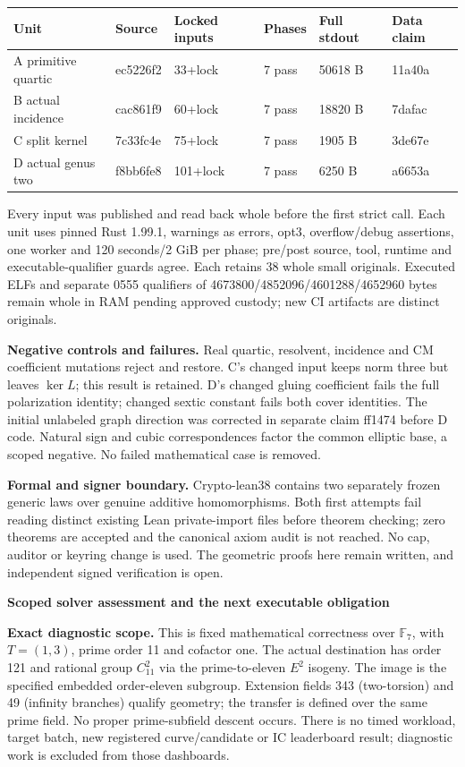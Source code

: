 \documentclass[10pt,a4paper]{article}
\begin{document}
\begin{center}\small
\begin{tabular}{llllll}
\toprule
Unit & Source & Locked inputs & Phases & Full stdout & Data claim\\
\midrule
A primitive quartic & ec5226f2 & 33+lock & 7 pass & 50618 B & 11a40a\\
B actual incidence & cac861f9 & 60+lock & 7 pass & 18820 B & 7dafac\\
C split kernel & 7c33fc4e & 75+lock & 7 pass & 1905 B & 3de67e\\
D actual genus two & f8bb6fe8 & 101+lock & 7 pass & 6250 B & a6653a\\
\bottomrule
\end{tabular}\end{center}
Every input was published and read back whole before the first strict
call. Each unit uses pinned Rust 1.99.1, warnings as errors, opt3,
overflow/debug assertions, one worker and 120 seconds/2 GiB per phase;
pre/post source, tool, runtime and executable-qualifier guards agree.
Each retains 38 whole small originals. Executed ELFs and separate 0555
qualifiers of 4673800/4852096/4601288/4652960 bytes remain whole in RAM
pending approved custody; new CI artifacts are distinct originals.

\textbf{Negative controls and failures.} Real quartic, resolvent,
incidence and CM coefficient mutations reject and restore. C's changed
input keeps norm three but leaves $\ker L$; this result is retained.
D's changed gluing coefficient fails the full polarization identity;
changed sextic constant fails both cover identities. The initial
unlabeled graph direction was corrected in separate claim ff1474 before
D code. Natural sign and cubic correspondences factor the common
elliptic base, a scoped negative. No failed mathematical case is removed.

\textbf{Formal and signer boundary.} Crypto-lean38 contains two separately
frozen generic laws over genuine additive homomorphisms. Both first
attempts fail reading distinct existing Lean private-import files before
theorem checking; zero theorems are accepted and the canonical axiom audit
is not reached. No cap, auditor or keyring change is used. The geometric
proofs here remain written, and independent signed verification is open.

\newpage
{\Large\bfseries Scoped solver assessment and the next executable obligation}\par

\textbf{Exact diagnostic scope.} This is fixed mathematical correctness
over $\mathbb F_7$, with $T=(1,3)$, prime order 11 and cofactor one.
The actual destination has order 121 and rational group $C_{11}^2$ via
the prime-to-eleven $E^2$ isogeny. The image is the specified embedded
order-eleven subgroup. Extension fields 343 (two-torsion) and 49
(infinity branches) qualify geometry; the transfer is defined over the
same prime field. No proper prime-subfield descent occurs. There is no
timed workload, target batch, new registered curve/candidate or IC
leaderboard result; diagnostic work is excluded from those dashboards.
\end{document}
